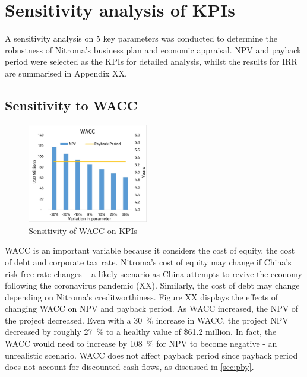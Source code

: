 \section{Sensitivity analysis of KPIs}
A sensitivity analysis on 5 key parameters was conducted to determine the robustness of Nitroma’s business plan and economic appraisal. NPV and payback period were selected as the KPIs for detailed analysis, whilst the results for IRR are summarised in Appendix XX. 

\subsection{Sensitivity to WACC}
\begin{figure}
    \caption{Sensitivity of WACC on KPIs}
    \label{Sensitivity_WACC}
    \includegraphics[width=0.47\textwidth]{chapters/6-economics/figures/Sensitivity_WACC.jpg}
\end{figure}
WACC is an important variable because it considers the cost of equity, the cost of debt and corporate tax rate. Nitroma’s cost of equity may change if China’s risk-free rate changes – a likely scenario as China attempts to revive the economy following the coronavirus pandemic (XX). Similarly, the cost of debt may change depending on Nitroma’s creditworthiness.  Figure XX displays the effects of changing WACC on NPV and payback period. As WACC increased, the NPV of the project decreased. Even with a \SI{30}{\percent} increase in WACC, the project NPV decreased by roughly \SI{27}{\percent} to a healthy value of \$61.2 million. In fact, the WACC would need to increase by \SI{108}{\percent} for NPV to become negative - an unrealistic scenario. WACC does not affect payback period since payback period does not account for discounted cash flows, as discussed in \cref{sec:pby}. 

